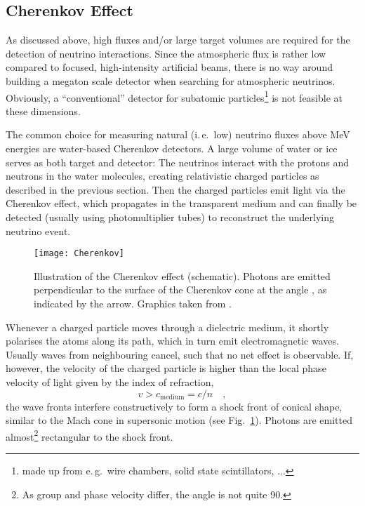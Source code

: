 \subsection{Cherenkov Effect}
\label{sec:Cherenkov}

As discussed above, high fluxes and/or large target volumes are required for 
the detection of neutrino interactions. Since the atmospheric flux is rather 
low compared to focused, high-intensity artificial beams, there is no way 
around building a megaton scale detector when searching for atmospheric 
neutrinos. Obviously, a ``conventional'' detector for subatomic 
particles\footnote{made up from e.\,g.\ wire chambers, solid state 
scintillators, ...} is not feasible at these dimensions.

The common choice for measuring natural (i.\,e.\ low) neutrino fluxes above 
MeV energies are water-based Cherenkov detectors. A large volume of water or 
ice serves as both target and detector: The neutrinos interact with the protons 
and neutrons in the water molecules, creating relativistic charged particles as
described in the previous section. Then the charged particles emit light via the
Cherenkov effect, which propagates in the transparent medium and can finally be
detected (usually using photomultiplier tubes) to reconstruct the underlying
neutrino event.

\begin{figure}
  \centering
  \texttt{[image: Cherenkov]}
  \caption{Illustration of the Cherenkov effect (schematic). Photons are
    emitted perpendicular to the surface of the Cherenkov cone at the angle
    , as indicated by the arrow. Graphics taken from
    \cite{Jackson}.}
\label{fig:Cherenkov}
\end{figure}

Whenever a charged particle moves through a dielectric medium, it shortly 
polarises the atoms along its path, which in turn emit electromagnetic waves. 
Usually waves from neighbouring cancel, such that no net effect is observable. 
If, however, the velocity of the charged particle is higher than the local 
phase velocity of light given by the index of refraction,
\begin{equation}
 v > c_{\mathrm{medium}} = c/n \quad, \label{eqn:ChkovThr}
\end{equation}
the wave fronts interfere constructively to form a shock front of conical 
shape, similar to the Mach cone in supersonic motion (see 
Fig.~\ref{fig:Cherenkov}). Photons are emitted almost\footnote{As group and 
phase velocity differ, the angle is not quite 90\textdegree.} rectangular to 
the shock front.

